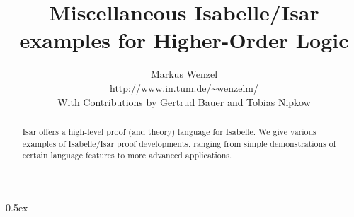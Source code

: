 





\title{Miscellaneous Isabelle/Isar examples for Higher-Order Logic}
\author{Markus Wenzel \\ \url{http://www.in.tum.de/~wenzelm/} \\[2ex]
  With Contributions by Gertrud Bauer and Tobias Nipkow}
\maketitle

\begin{abstract}
  Isar offers a high-level proof (and theory) language for Isabelle.
  We give various examples of Isabelle/Isar proof developments,
  ranging from simple demonstrations of certain language features to
  more advanced applications.
\end{abstract}

\tableofcontents

\parindent 0pt \parskip 0.5ex


\nocite{isabelle-isar-ref,Wenzel:1999:TPHOL}




